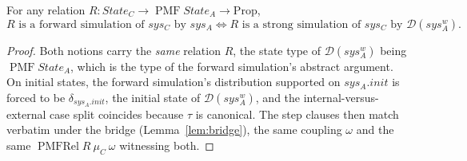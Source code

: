 \begin{theorem}[Forward simulation $=$ strong simulation into $\mathcal{D}(\cdot^w)$]
  \label{thm:forward-equiv}
  \leanok
  For any relation $R : State_C \to \operatorname{PMF} State_A \to \mathrm{Prop}$,
  \[
    \text{$R$ is a forward simulation of $sys_C$ by $sys_A$}
    \iff
    \text{$R$ is a strong simulation of $sys_C$ by $\mathcal{D}(sys_A^w)$.}
  \]
\end{theorem}

\begin{proof}\leanok
  Both notions carry the \emph{same} relation $R$, the state type of $\mathcal{D}(sys_A^w)$ being $\operatorname{PMF} State_A$, which is the type of the forward simulation's abstract argument.
  On initial states, the forward simulation's distribution supported on $sys_A.init$ is forced to be $\delta_{sys_A.init}$, the initial state of $\mathcal{D}(sys_A^w)$, and the internal-versus-external case split coincides because $\tau$ is canonical.
  The step clauses then match verbatim under the bridge (Lemma~\ref{lem:bridge}), the same coupling $\omega$ and the same $\operatorname{PMFRel} R\ \mu_C\ \omega$ witnessing both.
\end{proof}

